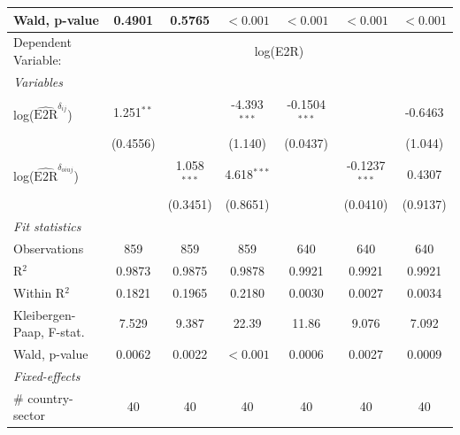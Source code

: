\documentclass[a4paper]{article}
\begin{document}
\begin{table}[h!]
\begin{tabular}{lcccccc}
       Wald, p-value & 0.4901                & 0.5765                 & $<0.001$  & $<0.001$ & $<0.001$  & $<0.001$ \\  
      \midrule
            Dependent Variable: & \multicolumn{6}{c}{log(E2R)}\\ \cmidrule(lr){2-7}
       \emph{Variables}\\
      log($\hat{\text{E2R}}^{\delta_{ij}}$)        & 1.251$^{**}$          &                        & -4.393$^{***}$         & -0.1504$^{***}$       &                        & -0.6463\\   
                                & (0.4556)              &                        & (1.140)                & (0.0437)              &                        & (1.044)\\   
      log($\hat{\text{E2R}}^{\delta_{oiuj}}$)             &                       & 1.058$^{***}$          & 4.618$^{***}$          &                       & -0.1237$^{***}$        & 0.4307\\   
                               &                       & (0.3451)               & (0.8651)               &                       & (0.0410)               & (0.9137)\\
      \emph{Fit statistics}\\
      Observations              & 859                   & 859                    & 859                    & 640                   & 640                    & 640\\  
      R$^2$                     & 0.9873                & 0.9875                 & 0.9878                 & 0.9921                & 0.9921                 & 0.9921\\  
      Within R$^2$              & 0.1821                & 0.1965                 & 0.2180                 & 0.0030                & 0.0027                 & 0.0034\\ 
      Kleibergen-Paap, F-stat.                 & 7.529                 & 9.387                  & 22.39                  & 11.86                 & 9.076                  & 7.092\\
      Wald, p-value & 0.0062                & 0.0022                 & $<0.001$  & 0.0006                & 0.0027                 & 0.0009\\ 
      \midrule
      \emph{Fixed-effects}\\
      \# country-sector         & 40                   & 40                   & 40                      & 40                   & 40                   & 40 \\

\end{tabular}
\end{table}
\end{document}
